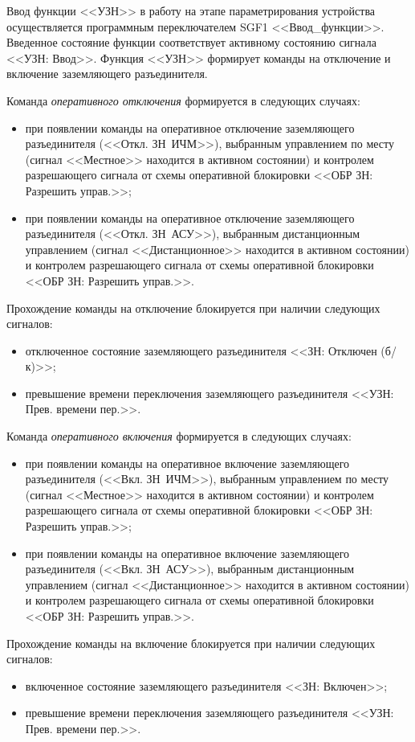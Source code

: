 \par
Ввод функции <<УЗН>> в работу на этапе параметрирования устройства осуществляется программным переключателем SGF1 <<Ввод\_функции>>. Введенное состояние функции соответствует активному состоянию сигнала <<УЗН: Ввод>>.
Функция <<УЗН>> формирует команды на отключение и включение заземляющего разъединителя.

\par
Команда \emph{оперативного отключения} формируется в следующих случаях:
\begin{itemize}
	\item при появлении команды на оперативное отключение заземляющего разъединителя (<<Откл. ЗН~ИЧМ>>), выбранным управлением по месту (сигнал <<Местное>> находится в активном состоянии) и контролем разрешающего сигнала от схемы оперативной блокировки <<ОБР ЗН: Разрешить управ.>>;
	\item при появлении команды на оперативное отключение заземляющего разъединителя (<<Откл. ЗН~АСУ>>), выбранным дистанционным управлением (сигнал <<Дистанционное>> находится в активном состоянии) и контролем разрешающего сигнала от схемы оперативной блокировки <<ОБР ЗН: Разрешить управ.>>.
\end{itemize}
Прохождение команды на отключение блокируется при наличии следующих сигналов:
\begin{itemize}
	\item отключенное состояние заземляющего разъединителя <<ЗН: Отключен (б/к)>>;
	\item превышение времени переключения заземляющего разъединителя <<УЗН: Прев. времени пер.>>.
\end{itemize}

\par
Команда \emph{оперативного включения} формируется в следующих случаях:
\begin{itemize}
	\item при появлении команды на оперативное включение заземляющего разъединителя (<<Вкл. ЗН~ИЧМ>>), выбранным управлением по месту (сигнал <<Местное>> находится в активном состоянии) и контролем разрешающего сигнала от схемы оперативной блокировки <<ОБР ЗН: Разрешить управ.>>;
	\item при появлении команды на оперативное включение заземляющего разъединителя (<<Вкл. ЗН~АСУ>>), выбранным дистанционным управлением (сигнал <<Дистанционное>> находится в активном состоянии) и контролем разрешающего сигнала от схемы оперативной блокировки <<ОБР ЗН: Разрешить управ.>>.
\end{itemize}
Прохождение команды на включение блокируется при наличии следующих сигналов:
\begin{itemize}
	\item включенное состояние заземляющего разъединителя <<ЗН: Включен>>;
	\item превышение времени переключения заземляющего разъединителя <<УЗН: Прев. времени пер.>>.
\end{itemize}

